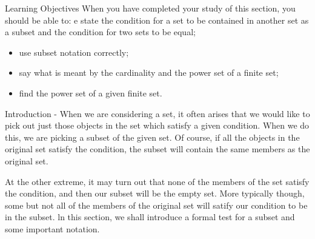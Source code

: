 \documentclass{beamer}
\begin{document}
\begin{frame}
\begin{frame}
\begin{frame}
\begin{frame}
Learning Objectives
When you have completed your study of this section, you should be able to:
e state the condition for a set to be contained in another set as a subset and the condition for
two sets to be equal; 
\begin{itemize}
\item use subset notation correctly;
\item  say what is meant by the cardinality and the power set of a finite set;
\item  ﬁnd the power set of a given ﬁnite set.
\end{itemize}
\end{frame}
\begin{frame}
Introduction -
When we are considering a set, it often arises that we would like to pick out just those objects in
the set which satisfy a given condition. When we do this, we are picking a subset of the given set.
Of course, if all the objects in the original set satisfy the condition, the subset will contain the
same members as the original set. 

\end{frame}
\begin{frame}
At the other extreme, it may turn out that none of the members
of the set satisfy the condition, and then our subset will be the empty set. More typically though,
some but not all of the members of the original set will satify our condition to be in the subset.
ln this section, we shall introduce a formal test for a subset and some important notation.

\end{frame}

\end{frame}
\end{frame}
\end{frame}
\end{document}
